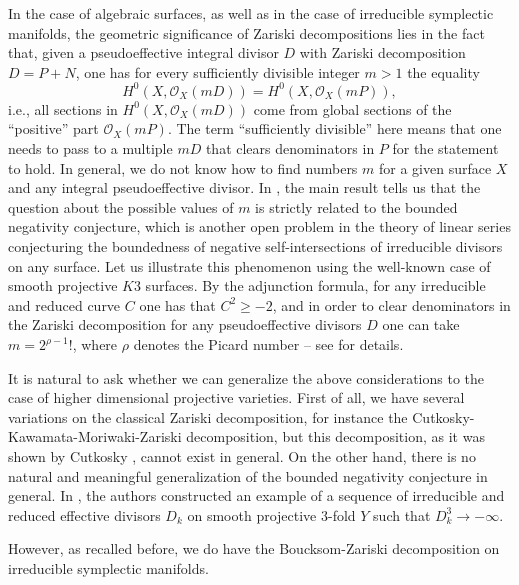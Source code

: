 \documentclass[12pt,reqno]{amsart}
\theoremstyle{plain}
\theoremstyle{definition}
\begin{document}
In the case of algebraic surfaces, as well as in the case of irreducible symplectic manifolds, the geometric significance of Zariski decompositions lies in the fact
that, given a pseudoeffective integral divisor $D$ with Zariski decomposition $D =P + N$,
one has for every sufficiently divisible integer $m > 1$ the equality
$$H^{0}(X, \mathcal{O}_{X}(mD)) = H^{0}(X, \mathcal{O}_{X}(mP)),$$ i.e., all sections in $H^{0}(X, \mathcal{O}_{X}(mD))$ come from global sections of the ``positive''   part  $\mathcal{O}_{X}(mP)$. The term
``sufficiently divisible'' here means that one needs to pass to a multiple $mD$ that clears denominators in $P$ for the statement to hold. In general, we do not know how to find numbers $m$ for a given surface $X$ and any integral pseudoeffective divisor. In \cite{BPS17}, the main result tells us that the question about the possible values of $m$ is strictly related to the bounded negativity conjecture, which is another open problem in the theory of linear series conjecturing the boundedness of negative self-intersections of irreducible divisors on any surface. Let us illustrate this phenomenon using  the   well-known case of smooth projective $K3$ surfaces. By the adjunction formula,  for any irreducible and reduced curve $C$ one has that $C^{2} \geq -2$, and in order to clear denominators in the Zariski decomposition for any pseudoeffective divisors $D$ one can take $m = 2^{\rho - 1}!$, where $\rho$ denotes the Picard number -- see \cite[Example 3.2]{BPS17} for details. 

It is natural to ask whether we can generalize the above considerations to the case of higher dimensional projective varieties. First of all, we have several variations on the classical Zariski decomposition, for instance the Cutkosky-Kawamata-Moriwaki-Zariski decomposition, but this decomposition, as it was shown by Cutkosky \cite{Cutkosky}, cannot exist in general. On the other hand, there is no natural and meaningful generalization of the bounded negativity conjecture in general. In \cite{lesottem}, the authors constructed an example of a sequence of irreducible and reduced effective divisors $D_{k}$ on smooth projective $3$-fold $Y$ such that $D_{k}^{3} \rightarrow -\infty$. 

However, as recalled before, we do have the Boucksom-Zariski decomposition on irreducible symplectic manifolds. 
\end{document}
